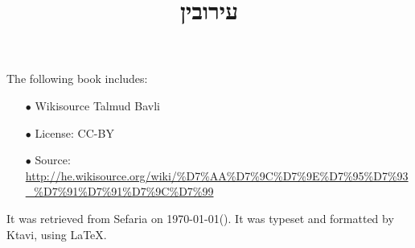 \documentclass[12pt, openany]{book}
\newcommand{\texttitle}{עירובין}\usepackage{titlesec}
\begin{document}
\frontmatter
{}

\title{\texttitle}

\author{}

\date{}

\maketitle

\begin{minipage}[b][\textheight][b]{\textwidth}\englishfont	
	\begin{english}
		\vfill
		The following book includes:
\begin{itemize}
\item[$\bullet$] Wikisource Talmud Bavli
\item[$\bullet$] License: CC-BY
\item[$\bullet$] Source: \url{http://he.wikisource.org/wiki/%D7%AA%D7%9C%D7%9E%D7%95%D7%93_%D7%91%D7%91%D7%9C%D7%99}
\end{itemize}
		It was retrieved from Sefaria on \today\space \texthebrew{(\Hebrewtoday)}.  It was typeset and formatted by Ktavi, using \LaTeX .
		\clearpage
		
	\end{english}
\end{minipage}


\tableofcontents

\clearpage
\mainmatter
{}
\end{document}
